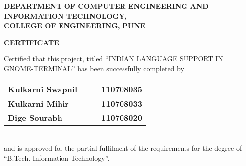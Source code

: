 % 
\thispagestyle{empty}
\linespread{2}
\begin{center}			%
	\Large{\bf{DEPARTMENT OF COMPUTER ENGINEERING AND\\  INFORMATION TECHNOLOGY,\\ 
	       COLLEGE OF ENGINEERING, PUNE\\}}	
\end{center}

\vspace{20pt}			%

\begin{center}
	\Large{\bf{CERTIFICATE\\}}
\end{center}

\vspace{20pt}

\linespread{2}			%
\selectfont
\large{
Certified that this project, titled ``INDIAN LANGUAGE SUPPORT IN GNOME-TERMINAL''
has been successfully completed by \\ 
\begin{table}[htbp]
	\begin{center}
	\begin{tabular}{ l c c l }
	\Large\bf{Kulkarni Swapnil} & & & \Large\bf{110708035} \\ [0.3cm]
	\Large\bf{Kulkarni Mihir} & & & \Large\bf{110708033} \\ [0.3cm]
	\Large\bf{Dige Sourabh} & & & \Large\bf{110708020} \\
	\end{tabular}
	\end{center}
	\end{table} \\
and is approved for the partial fulfilment of the requirements for the degree of 
``B.Tech. Information Technology''.
}

\vspace{80pt}

